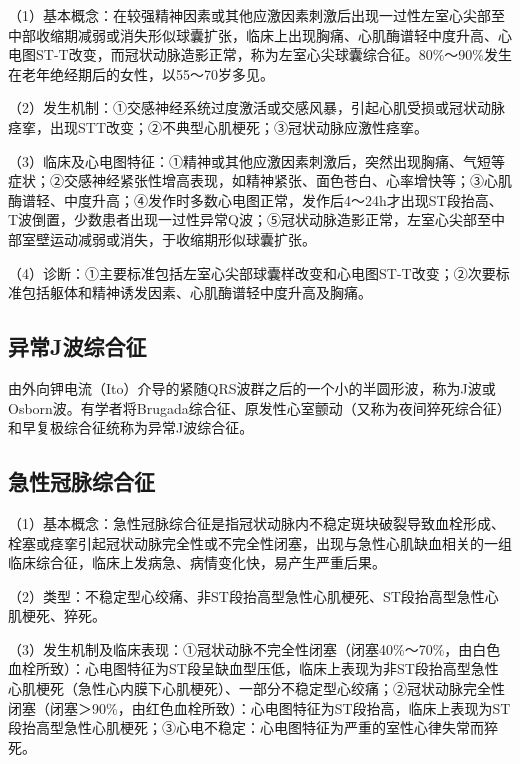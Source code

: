 （1）基本概念：在较强精神因素或其他应激因素刺激后出现一过性左室心尖部至中部收缩期减弱或消失形似球囊扩张，临床上出现胸痛、心肌酶谱轻中度升高、心电图ST-T改变，而冠状动脉造影正常，称为左室心尖球囊综合征。80\%～90\%发生在老年绝经期后的女性，以55～70岁多见。

（2）发生机制：①交感神经系统过度激活或交感风暴，引起心肌受损或冠状动脉痉挛，出现STT改变；②不典型心肌梗死；③冠状动脉应激性痉挛。

（3）临床及心电图特征：①精神或其他应激因素刺激后，突然出现胸痛、气短等症状；②交感神经紧张性增高表现，如精神紧张、面色苍白、心率增快等；③心肌酶谱轻、中度升高；④发作时多数心电图正常，发作后4～24h才出现ST段抬高、T波倒置，少数患者出现一过性异常Q波；⑤冠状动脉造影正常，左室心尖部至中部室壁运动减弱或消失，于收缩期形似球囊扩张。

（4）诊断：①主要标准包括左室心尖部球囊样改变和心电图ST-T改变；②次要标准包括躯体和精神诱发因素、心肌酶谱轻中度升高及胸痛。

\protect\hypertarget{text00047.htmlux5cux23subid572}{}{}

\subsection{异常J波综合征}

由外向钾电流（Ito）介导的紧随QRS波群之后的一个小的半圆形波，称为J波或Osborn波。有学者将Brugada综合征、原发性心室颤动（又称为夜间猝死综合征）和早复极综合征统称为异常J波综合征。

\protect\hypertarget{text00047.htmlux5cux23subid573}{}{}

\subsection{急性冠脉综合征}

（1）基本概念：急性冠脉综合征是指冠状动脉内不稳定斑块破裂导致血栓形成、栓塞或痉挛引起冠状动脉完全性或不完全性闭塞，出现与急性心肌缺血相关的一组临床综合征，临床上发病急、病情变化快，易产生严重后果。

（2）类型：不稳定型心绞痛、非ST段抬高型急性心肌梗死、ST段抬高型急性心肌梗死、猝死。

（3）发生机制及临床表现：①冠状动脉不完全性闭塞（闭塞40\%～70\%，由白色血栓所致）：心电图特征为ST段呈缺血型压低，临床上表现为非ST段抬高型急性心肌梗死（急性心内膜下心肌梗死）、一部分不稳定型心绞痛；②冠状动脉完全性闭塞（闭塞＞90\%，由红色血栓所致）：心电图特征为ST段抬高，临床上表现为ST段抬高型急性心肌梗死；③心电不稳定：心电图特征为严重的室性心律失常而猝死。


